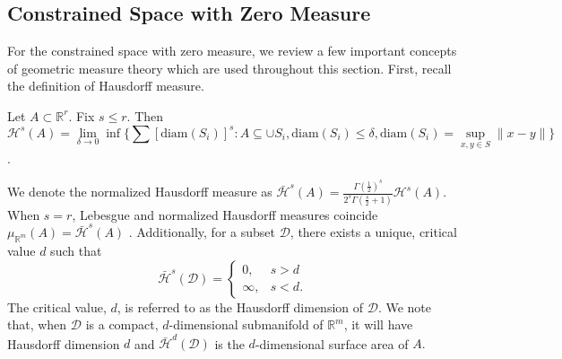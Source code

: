 \documentclass[10pt,fleqn]{article}
\newcommand{\bb}[1]{\mathbb{#1}} \newcommand{\mc}[1]{\mathcal{#1}}
\DeclareMathOperator{\1}{\mathbbm{1}} \DeclareMathOperator{\bigO}{\mc O}
\begin{document}
\subsection{Constrained Space with Zero Measure}
\label{SEC:Zero_measure_theory}

For the constrained space with zero measure, we review a few important concepts of
geometric measure theory which are used throughout this section.  First,
recall the definition of Hausdorff measure.  \begin{Hausdorff_def} Let
$A\subset \bb R^r$. Fix $s \le r$. Then $$\mc H^{s}(A)=
\underset{\delta\rightarrow 0}\lim \inf \bigg\{ \sum
\left[{\text{diam}(S_i)}\right]^s: {A\subseteq \cup S_i,
\text{diam}(S_i)\le \delta}, \text{diam}(S_i)=\sup_{x,y\in
S}\|x-y\|\bigg\}$$.  \end{Hausdorff_def} We denote the normalized Hausdorff
measure as $\bar{\mc H}^{s}(A) =\frac{\Gamma(\frac{1}{2})^{s}}{2^s
\Gamma(\frac{s}{2}+1)} \mc H^{s}(A)$. When $s=r$, Lebesgue and normalized
Hausdorff measures coincide  $\mu_{\mathbb{R}^m}(A)= \bar{\mc H}^{s}(A)$
\citep{evans2015measure}.  Additionally, for a subset $\mathcal{D}$, there
exists a unique, critical value $d$ such that
$$\bar{\mathcal{H}}^s(\mathcal{D}) = \begin{cases} 0, & s > d \\ \infty, &
s < d.\end{cases}$$ The critical value, $d$, is referred to as the
Hausdorff dimension of $\mathcal{D}$. We note that, when $\mathcal{D}$ is a
compact, $d$-dimensional submanifold of $\mathbb{R}^m$, it will have
Hausdorff dimension $d$ and $\bar{\mathcal{H}}^d(\mathcal{D})$ is the
$d$-dimensional surface area of $A.$
\end{document}
